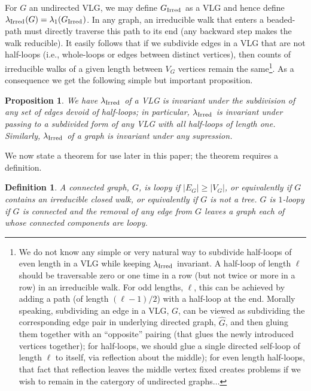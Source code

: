 \documentclass[12pt]{article}
\newtheorem{proposition}[theorem]{Proposition}
\newtheorem{definition}[theorem]{Definition}
\newcommand{\ird}[1]{{\rm Irred}_{#1}}
\begin{document}
For $G$ an undirected VLG, we may define
$G_{\ird{}}$ as a VLG and hence define $\lambda_{\ird{}}(G)=
\lambda_1(G_{\ird{}})$.
In any graph,
an irreducible walk that enters a beaded-path must directly traverse this
path to its end (any backward step makes the walk reducible).
It easily follows that if we subdivide edges in a VLG that are not
half-loops
(i.e., whole-loops or edges between distinct vertices),
then counts of irreducible walks of a given length between $V_G$ vertices
remain the same\footnote{We do not know any simple or very natural way
to subdivide half-loops of even length
in a VLG while keeping $\lambda_{\ird{}}$
invariant.  A half-loop of length $\ell$ should be traversable zero
or one time in a row (but not twice or more in a row) in an irreducible
walk.  For odd lengths, $\ell$, this can be achieved by adding a path 
(of length $(\ell-1)/2$) with a
half-loop at the end.  
Morally speaking, subdividing an edge in a VLG, $G$,
can be
viewed as subdividing the corresponding edge pair in
underlying directed graph, $\widehat G$, and then gluing them
together with an ``opposite'' pairing (that glues the newly introduced
vertices together); for half-loops, we should glue a single directed 
self-loop of length $\ell$ to itself, via reflection about the middle);
for even length half-loops, that fact that reflection leaves the middle
vertex fixed creates problems if we wish to remain in the catergory of
undirected graphs$\ldots$
}.
As a 
consequence we get the following simple but important proposition.
\begin{proposition}
\label{pr:ird_invar}
We have
$\lambda_{\ird{}}$ of a VLG
is invariant under the subdivision of any set of edges devoid of
half-loops; in particular, $\lambda_{\ird{}}$ is invariant under
passing to a subdivided form of any VLG with all half-loops of length one.
Similarly, 
$\lambda_{\ird{}}$ of a graph is invariant under any supression.
\end{proposition}

We now state a theorem for use later in this paper; the theorem requires
a definition.
\begin{definition} A connected graph, $G$, is {\em loopy} if
$|E_G|\ge |V_G|$, or equivalently if $G$ contains an irreducible closed walk, 
or
equivalently if $G$ is not a tree.  $G$ is {\em $1$-loopy} if $G$ is
connected and the removal of any edge from $G$ leaves a graph each of
whose connected components are loopy.
\end{definition}
\end{document}
